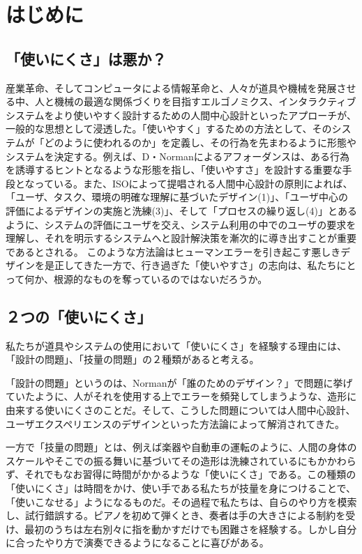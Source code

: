 \chapter{はじめに}
\label{introduction}

\section*{「使いにくさ」は悪か？}
産業革命、そしてコンピュータによる情報革命と、人々が道具や機械を発展させる中、人と機械の最適な関係づくりを目指すエルゴノミクス、インタラクティブシステムをより使いやすく設計するための人間中心設計といったアプローチが、一般的な思想として浸透した。「使いやすく」するための方法として、そのシステムが「どのように使われるのか」を定義し、その行為を先まわるように形態やシステムを決定する。例えば、D・Normanによるアフォーダンスは、ある行為を誘導するヒントとなるような形態を指し、「使いやすさ」を設計する重要な手段となっている。また、ISOによって提唱される人間中心設計の原則\cite{hcd}によれば、「ユーザ、タスク、環境の明確な理解に基づいたデザイン(1)」、「ユーザ中心の評価によるデザインの実施と洗練(3)」、そして「プロセスの繰り返し(4)」とあるように、システムの評価にユーザを交え、システム利用の中でのユーザの要求を理解し、それを明示するシステムへと設計解決策を漸次的に導き出すことが重要であるとされる。
このような方法論はヒューマンエラーを引き起こす悪しきデザインを是正してきた一方で、行き過ぎた「使いやすさ」の志向は、私たちにとって何か、根源的なものを奪っているのではないだろうか。

\section*{２つの「使いにくさ」}
私たちが道具やシステムの使用において「使いにくさ」を経験する理由には、「設計の問題」、「技量の問題」の２種類があると考える。

「設計の問題」というのは、Normanが「誰のためのデザイン？」で問題に挙げていたように、人がそれを使用する上でエラーを頻発してしまうような、造形に由来する使いにくさのことだ。そして、こうした問題については人間中心設計、ユーザエクスペリエンスのデザインといった方法論によって解消されてきた。

一方で「技量の問題」とは、例えば楽器や自動車の運転のように、人間の身体のスケールやそこでの振る舞いに基づいてその造形は洗練されているにもかかわらず、それでもなお習得に時間がかかるような「使いにくさ」である。この種類の「使いにくさ」は時間をかけ、使い手である私たちが技量を身につけることで、「使いこなせる」ようになるものだ。その過程で私たちは、自らのやり方を模索し、試行錯誤する。ピアノを初めて弾くとき、奏者は手の大きさによる制約を受け、最初のうちは左右別々に指を動かすだけでも困難さを経験する。しかし自分に合ったやり方で演奏できるようになることに喜びがある。

